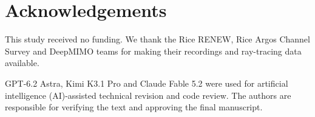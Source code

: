 
\section*{Acknowledgements}
This study received no funding. We thank the Rice RENEW, Rice Argos Channel Survey and DeepMIMO teams for making their recordings and ray-tracing data available.

GPT-6.2 Astra, Kimi K3.1 Pro and Claude Fable 5.2 were used for artificial intelligence (AI)-assisted technical revision and code review. The authors are responsible for verifying the text and approving the final manuscript.

